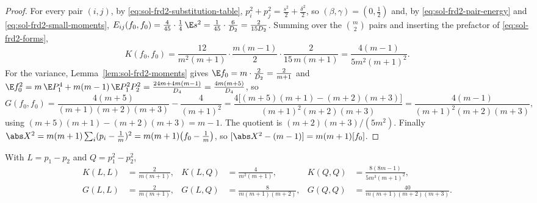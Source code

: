 \documentclass[../main.tex]{subfiles}
\begin{document}
\begin{proof}
For every pair $(i,j)$, by \eqref{eq:sol-frd2-substitution-table},
$p_i^2+p_j^2=\tfrac{s^2}2+\tfrac{\delta^2}2$, so
$(\beta,\gamma)=(0,\tfrac12)$ and, by \eqref{eq:sol-frd2-pair-energy} and
\eqref{eq:sol-frd2-small-moments},
$E_{ij}(f_0,f_0)=\tfrac4{45}\cdot\tfrac14\,\E s^2=\tfrac1{45}\cdot\tfrac6{D_2}
=\tfrac2{15D_2}$.
Summing over the $\binom m2$ pairs and inserting the prefactor of
\eqref{eq:sol-frd2-forms},
\[
  K(f_0,f_0)
  =\frac{12}{m^2(m+1)}\cdot\frac{m(m-1)}2\cdot\frac2{15\,m(m+1)}
  =\frac{4(m-1)}{5m^2(m+1)^2}.
\]
For the variance, Lemma~\ref{lem:sol-frd2-moments} gives
$\E f_0=m\cdot\tfrac2{D_2}=\tfrac2{m+1}$ and
$\E f_0^2=m\,\E P_1^4+m(m-1)\,\E P_1^2P_2^2
=\tfrac{24m+4m(m-1)}{D_4}=\tfrac{4m(m+5)}{D_4}$, so
\[
  G(f_0,f_0)
  =\frac{4(m+5)}{(m+1)(m+2)(m+3)}-\frac4{(m+1)^2}
  =\frac{4\bigl[(m+5)(m+1)-(m+2)(m+3)\bigr]}{(m+1)^2(m+2)(m+3)}
  =\frac{4(m-1)}{(m+1)^2(m+2)(m+3)},
\]
using $(m+5)(m+1)-(m+2)(m+3)=m-1$.  The quotient is
$(m+2)(m+3)/(5m^2)$.  Finally
$\abs X^2=m(m+1)\sum_i(p_i-\tfrac1m)^2=m(m+1)\bigl(f_0-\tfrac1m\bigr)$, so
$[\abs X^2-(m-1)]=m(m+1)[f_0]$.
\end{proof}

\begin{lemma}
\label{lem:sol-frd2-standard}
With $L=p_1-p_2$ and $Q=p_1^2-p_2^2$,
\begin{equation}
\begin{aligned}
  K(L,L)&=\frac2{m(m+1)}, &
  K(L,Q)&=\frac4{m^2(m+1)}, &
  K(Q,Q)&=\frac{8(8m-1)}{5m^3(m+1)^2},\\
  G(L,L)&=\frac2{m(m+1)}, &
  G(L,Q)&=\frac8{m(m+1)(m+2)}, &
  G(Q,Q)&=\frac{40}{m(m+1)(m+2)(m+3)}.
\end{aligned}
  \label{eq:sol-frd2-standard-gram}
\end{equation}
\end{lemma}
\end{document}
